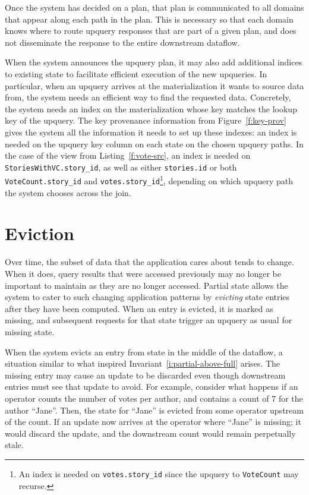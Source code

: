 Once the system has decided on a plan, that plan is communicated to all domains
that appear along each path in the plan. This is necessary so that each domain
knows where to route upquery responses that are part of a given plan, and does
not disseminate the response to the entire downstream dataflow.

When the system announces the upquery plan, it may also add additional indices
to existing state to facilitate efficient execution of the new upqueries. In
particular, when an upquery arrives at the materialization it wants to source
data from, the system needs an efficient way to find the requested data.
Concretely, the system needs an index on the materialization whose key matches
the lookup key of the upquery. The key provenance information from
Figure~\ref{f:key-prov} gives the system all the information it needs to set up
these indexes: an index is needed on the upquery key column on each state on the
chosen upquery paths. In the case of the view from Listing~\ref{f:vote-src}, an
index is needed on \texttt{StoriesWithVC.story\_id}, as well as either
\texttt{stories.id} or both \texttt{VoteCount.story\_id} and
\texttt{votes.story\_id}\footnote{An index is needed on \texttt{votes.story\_id}
since the upquery to \texttt{VoteCount} may recurse.}, depending on which
upquery path the system chooses across the join.

\section{Eviction}

Over time, the subset of data that the application cares about tends to change.
When it does, query results that were accessed previously may no longer be
important to maintain as they are no longer accessed. Partial state allows the
system to cater to such changing application patterns by \textit{evicting} state
entries after they have been computed. When an entry is evicted, it is marked as
missing, and subsequent requests for that state trigger an upquery as usual for
missing state.

When the system evicts an entry from state in the middle of the dataflow, a
situation similar to what inspired Invariant~\ref{i:partial-above-full} arises.
The missing entry may cause an update to be discarded even though downstream
entries must see that update to avoid. For example, consider what happens if an
operator counts the number of votes per author, and contains a count
of 7 for the author ``Jane''. Then, the state for ``Jane'' is evicted from some
operator upstream of the count. If an update now arrives at the operator where
``Jane'' is missing; it would discard the update, and the downstream count would
remain perpetually stale.

